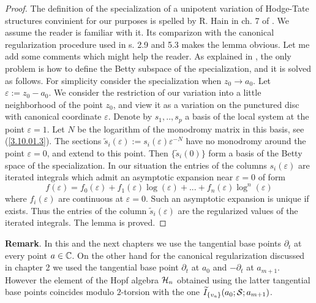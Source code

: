 \documentclass[10pt]{article}
\begin{document}
\begin{proof} The definition of the specialization of a 
unipotent variation of 
Hodge-Tate structures convinient  for our purposes is spelled  
by R. Hain in ch. 7 of \cite{H}. We assume the reader is familiar with it. 
Its comparizon  with the canonical regularization
 procedure used in s. 2.9 and 5.3 makes the lemma obvious. 
Let me add some comments which might help the reader. 
As explained in \cite{H},   
the only problem is how to define the Betty subspace of the specialization, 
and it is solved as follows. For simplicity consider the specialization when $z_0 \to a_0$. 
Let $\varepsilon:= z_0-a_0$. We consider the restriction of our variation into a 
little neighborhood of the point $z_0$, and view it as a variation on the punctured 
disc with canonical coordinate 
$\varepsilon$. Denote by 
$s_1, .., s_p$ a basis of the local system at the point $\varepsilon =1$.  Let $N$ be 
the logarithm of the monodromy matrix in this basis, see (\ref{3.10.01.3}). The sections 
$\widetilde s_i(\varepsilon):= s_i(\varepsilon) \varepsilon^{-N}$ 
have no monodromy around the point $\varepsilon =0$, and extend to this point.  Then 
$\{\widetilde s_i(0)\}$ form a basis of the Betty space of the specialization. 
 In our situation the entries of the columns $s_i(\varepsilon)$ are iterated integrals 
which admit an asymptotic expansion near $\varepsilon =0$ of form 
$$
f(\varepsilon) = f_0(\varepsilon)  + f_1(\varepsilon) \log(\varepsilon) + ... + 
f_n(\varepsilon) \log^n(\varepsilon)
$$ 
where $f_i(\varepsilon)$ are continuous at $\varepsilon =0$. 
Such an asymptotic expansion is unique if exists. Thus 
the entries of the column 
$\widetilde s_i(\varepsilon)$ are the regularized values 
of the iterated integrals. 
The lemma is proved.  


\end{proof}

{\bf Remark}. In this and the next chapters we use 
the tangential base points $\partial_t$ at every point $a \in {\mathbb C}$. 
On the other hand for the canonical regularization discussed in chapter 2 we used 
the tangential base point $\partial_t$ at $a_0$ and $-\partial_t$ at $a_{m+1}$. 
However the element of the Hopf algebra ${\cal H}_n$ obtained 
using the latter tangential base points coincides modulo $2$-torsion 
with the one $\widetilde I_{\{v_a\}}(a_0;{\cal S} ;a_{m+1})$. 
\end{document}
